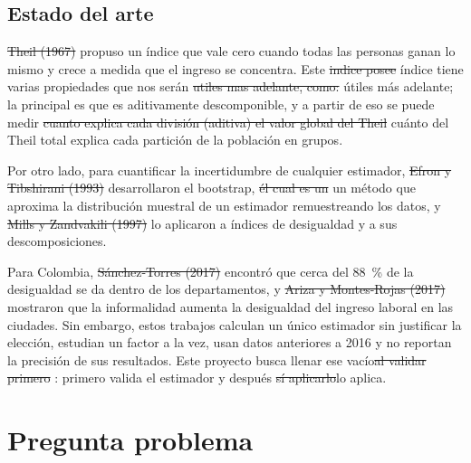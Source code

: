 \documentclass[12pt,letterpaper]{article}
\providecommand{\DIFaddtex}[1]{{\protect\color{BLUE}#1}} %
\providecommand{\DIFdeltex}[1]{{\protect\color{RED}\sout{#1}}} %
\providecommand{\DIFaddtex}[1]{\texorpdfstring{\DIFaddtex{#1}}{#1}} %
\providecommand{\DIFdeltex}[1]{\texorpdfstring{\DIFdeltex{#1}}{}} %
\providecommand{\DIFaddbegin}{}\providecommand{\DIFaddend}{} %
\providecommand{\DIFdelbegin}{}\providecommand{\DIFdelend}{} %
\providecommand{\DIFadd}[1]{\texorpdfstring{\DIFaddtex{#1}}{#1}} %
\providecommand{\DIFdel}[1]{\texorpdfstring{\DIFdeltex{#1}}{}} %
\begin{document}
\subsection{Estado del arte}

\DIFdelbegin \DIFdel{Theil (1967) }\DIFdelend \DIFaddbegin \DIFadd{\textcite{theil1967economics} }\DIFaddend propuso un índice que vale cero cuando todas las personas ganan lo mismo y crece a medida que el ingreso se concentra. Este \DIFdelbegin \DIFdel{indice posee }\DIFdelend \DIFaddbegin \DIFadd{índice tiene }\DIFaddend varias propiedades que nos serán \DIFdelbegin \DIFdel{utiles mas adelante, como: }\DIFdelend \DIFaddbegin \DIFadd{útiles más adelante; la principal es }\DIFaddend que es aditivamente descomponible, y a partir de eso se puede medir \DIFdelbegin \DIFdel{cuanto explica cada división (aditiva) el valor global del Theil }\DIFdelend \DIFaddbegin \DIFadd{cuánto del Theil total explica cada partición de la población en grupos}\DIFaddend .

Por otro lado, para cuantificar la incertidumbre de cualquier estimador, \DIFdelbegin \DIFdel{Efron y Tibshirani (1993) }\DIFdelend \DIFaddbegin \DIFadd{\textcite{efron1993introduction} }\DIFaddend desarrollaron el bootstrap, \DIFdelbegin \DIFdel{él cual es un }\DIFdelend un método que aproxima la distribución muestral de un estimador remuestreando los datos, y \DIFdelbegin \DIFdel{Mills y Zandvakili (1997) }\DIFdelend \DIFaddbegin \DIFadd{\textcite{mills1997statistical} }\DIFaddend lo aplicaron a índices de desigualdad y a sus descomposiciones.

Para Colombia, \DIFdelbegin \DIFdel{Sánchez-Torres (2017) }\DIFdelend \DIFaddbegin \DIFadd{\textcite{sanchez2017desigualdad} }\DIFaddend encontró que cerca del 88~\% de la desigualdad se da dentro de los departamentos, y \DIFdelbegin \DIFdel{Ariza y Montes-Rojas (2017) }\DIFdelend \DIFaddbegin \DIFadd{\textcite{ariza2017labour} }\DIFaddend mostraron que la informalidad aumenta la desigualdad del ingreso laboral en las ciudades. Sin embargo, estos trabajos calculan un único estimador sin justificar la elección, estudian un factor a la vez, usan datos anteriores a 2016 y no reportan la precisión de sus resultados. Este proyecto busca llenar ese vacío\DIFdelbegin \DIFdel{al validar primero }\DIFdelend \DIFaddbegin \DIFadd{: primero valida }\DIFaddend el estimador y después \DIFdelbegin \DIFdel{sí aplicarlo}\DIFdelend \DIFaddbegin \DIFadd{lo aplica}\DIFaddend .

\section{Pregunta problema}
\end{document}
